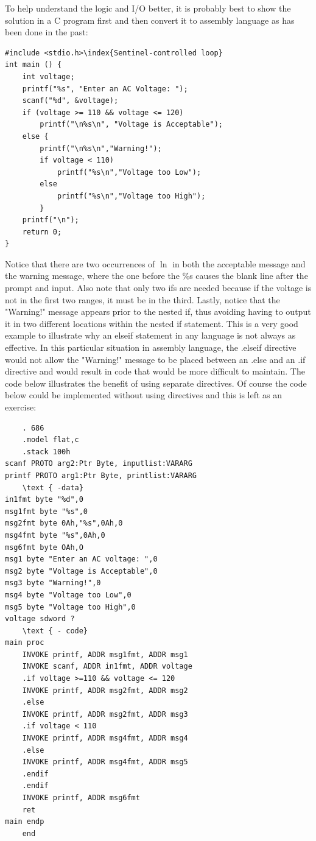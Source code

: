 \documentclass[10pt]{book}
\begin{document}
To help understand the logic and I/O better, it is probably best to show the solution in a C program first and then convert it to assembly language as has been done in the past:

\begin{verbatim}
#include <stdio.h>\index{Sentinel-controlled loop}
int main () {
    int voltage;
    printf("%s", "Enter an AC Voltage: ");
    scanf("%d", &voltage);
    if (voltage >= 110 && voltage <= 120)
        printf("\n%s\n", "Voltage is Acceptable");
    else {
        printf("\n%s\n","Warning!");
        if voltage < 110)
            printf("%s\n","Voltage too Low");
        else
            printf("%s\n","Voltage too High");
        }
    printf("\n");
    return 0;
}
\end{verbatim}

Notice that there are two occurrences of $\ln$ in both the acceptable message and the warning message, where the one before the \%s causes the blank line after the prompt and input. Also note that only two ifs are needed because if the voltage is not in the first two ranges, it must be in the third. Lastly, notice that the "Warning!" message appears prior to the nested if, thus avoiding having to output it in two different locations within the nested if statement. This is a very good example to illustrate why an elseif statement in any language is not always as effective. In this particular situation in assembly language, the .elseif directive would not allow the "Warning!" message to be placed between an .else and an .if directive and would result in code that would be more difficult to maintain. The code below illustrates the benefit of using separate directives. Of course the code below could be implemented without using directives and this is left as an exercise:

\begin{verbatim}
    . 686
    .model flat,c
    .stack 100h
scanf PROTO arg2:Ptr Byte, inputlist:VARARG
printf PROTO arg1:Ptr Byte, printlist:VARARG
    \text { -data}
in1fmt byte "%d",0
msg1fmt byte "%s",0
msg2fmt byte 0Ah,"%s",0Ah,0
msg4fmt byte "%s",0Ah,0
msg6fmt byte OAh,O
msg1 byte "Enter an AC voltage: ",0
msg2 byte "Voltage is Acceptable",0
msg3 byte "Warning!",0
msg4 byte "Voltage too Low",0
msg5 byte "Voltage too High",0
voltage sdword ?
    \text { - code}
main proc
    INVOKE printf, ADDR msg1fmt, ADDR msg1
    INVOKE scanf, ADDR in1fmt, ADDR voltage
    .if voltage >=110 && voltage <= 120
    INVOKE printf, ADDR msg2fmt, ADDR msg2
    .else
    INVOKE printf, ADDR msg2fmt, ADDR msg3
    .if voltage < 110
    INVOKE printf, ADDR msg4fmt, ADDR msg4
    .else
    INVOKE printf, ADDR msg4fmt, ADDR msg5
    .endif
    .endif
    INVOKE printf, ADDR msg6fmt
    ret
main endp
    end
\end{verbatim}
\end{document}
